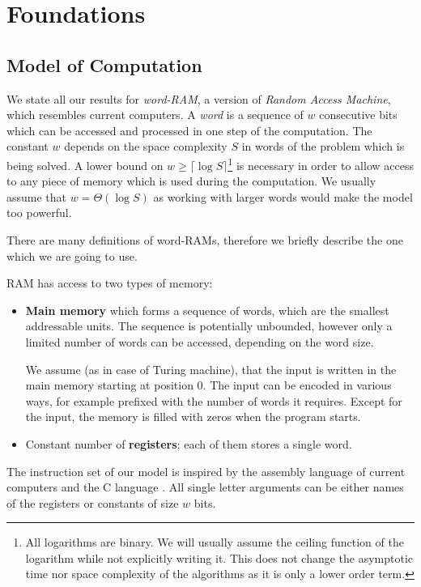 \chapter{Foundations}

\section{Model of Computation}

We state all our results for \emph{word-RAM}, a version of \emph{Random Access Machine}, which resembles current computers.
A \emph{word} is a sequence of $w$ consecutive bits which can be accessed and processed in one step of the computation.
The constant $w$ depends on the space complexity $S$ in words of the problem which is being solved.
A lower bound on $w \ge \lceil \log S \rceil$\footnote{
	All logarithms are binary. 
	We will usually assume the ceiling function of the logarithm while not explicitly writing it.
	This does not change the asymptotic time nor space complexity of the algorithms as it is only a lower order term.
}
 is necessary in order to allow access to any piece of memory which is used during the computation.
We usually assume that $w = \Theta(\log S)$ as working with larger words would make the model too powerful.

\bigbreak

There are many definitions of word-RAMs, therefore we briefly describe the one which we are going to use.

RAM has access to two types of memory:
\begin{itemize}
	\item \textbf{Main memory} which forms a sequence of words, which are the smallest addressable units.
	The sequence is potentially unbounded, however only a limited number of words can be accessed, depending on the word size.
	
	We assume (as in case of Turing machine), that the input is written in the main memory starting at position $0$.
	The input can be encoded in various ways, for example prefixed with the number of words it requires.
	Except for the input, the memory is filled with zeros when the program starts.
	
	\item Constant number of \textbf{registers}; each of them stores a single word.
\end{itemize}

The instruction set of our model is inspired by the assembly language of current computers and the C language \cite{kernighan2006c}.
All single letter arguments can be either names of the registers or constants of size $w$ bits.


